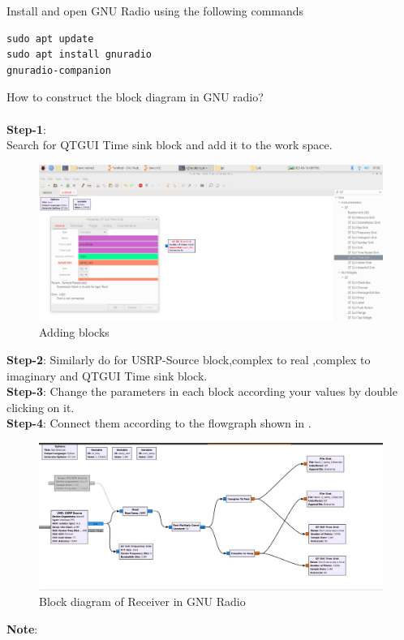\documentclass[11pt]{book}
\begin{document}
 Install and open GNU Radio using the following commands
\\
\begin{lstlisting}
sudo apt update
sudo apt install gnuradio
gnuradio-companion
\end{lstlisting}
 How to construct the block diagram in GNU radio? \\
	\solution  \\
\textbf{Step-1}:\\
Search for QTGUI Time sink  block and add it to the work space.
\begin{figure}[H]
\centering
\includegraphics[width=\columnwidth]{figs/add.png}
\caption{Adding blocks}
\label{fig:add blocks}
\end{figure}
\textbf{Step-2}:
Similarly do for USRP-Source block,complex to real ,complex to imaginary and QTGUI Time sink block.
\\
\textbf{Step-3}:
Change the parameters in each block according your values by double clicking on it.
\\
\textbf{Step-4}:
Connect them according to the flowgraph shown in .
\begin{figure}[H]
\centering
\includegraphics[width=\columnwidth]{figs/USRP_navic.jpg}
\caption{Block diagram of Receiver in GNU Radio}
\label{fig:Rx_Block_diagram}
\end{figure}
\textbf{Note}:
\end{document}
